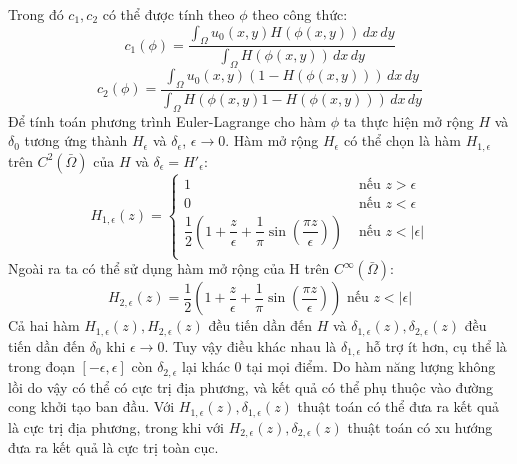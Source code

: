 \documentclass[12pt, oneside, a4]{book}
\begin{document}
Trong đó $c_1, c_2$ có thể được tính theo $\phi$ theo công thức:
\begin{equation*}
c_1(\phi)=\dfrac{\int_{\Omega}u_0(x,y)H(\phi(x,y))\,dx \,dy}{\int_{\Omega}H(\phi(x,y))\,dx\,dy}
\end{equation*}
\begin{equation*}
c_2(\phi)=\dfrac{\int_{\Omega}u_0(x,y)(1-H(\phi(x,y)))\,dx \,dy}{\int_{\Omega}H(\phi(x,y)1-H(\phi(x,y)))\,dx\,dy}
\end{equation*}
Để tính toán phương trình Euler-Lagrange cho hàm $\phi$ ta thực hiện mở rộng $H$ và $\delta_0$ tương ứng thành  $H_{\epsilon}$ và $\delta_{\epsilon}$, $\epsilon \rightarrow 0$. Hàm mở rộng $H_{\epsilon}$ có thể chọn là hàm $H_{1,{\epsilon}}$ trên $C^2(\bar{\Omega})$ của $H$ và $\delta_{\epsilon}=H'_{\epsilon}$:
\begin{equation*}
 H_{1,\epsilon}(z)=
\begin{cases}
 1 & \text{ nếu } z> \epsilon\\
0 & \text{ nếu } z <\epsilon \\
\dfrac{1}{2}(1+\dfrac{z}{\epsilon}+\dfrac{1}{\pi}\sin(\dfrac{\pi z}{\epsilon})) & \text{ nếu } z <|\epsilon|\\
   \end{cases}
\end{equation*}
Ngoài ra ta có thể sử dụng hàm mở rộng của H trên $C^{\infty}(\bar{\Omega})$:
\begin{equation*}
 H_{2,\epsilon}(z)=\dfrac{1}{2}(1+\dfrac{z}{\epsilon}+\dfrac{1}{\pi}\sin(\dfrac{\pi z}{\epsilon}))  \text{ nếu } z <|\epsilon|
\end{equation*}
Cả hai hàm $ H_{1,\epsilon}(z),  H_{2,\epsilon}(z)$ đều tiến dần đến $H$ và $ \delta_{1,\epsilon}(z),  \delta_{2,\epsilon}(z)$ đều tiến dần đến $\delta_0$ khi $\epsilon\rightarrow 0$. Tuy vậy điều khác nhau là $ \delta_{1,\epsilon}$ hỗ trợ ít hơn, cụ thể là trong đoạn $[-\epsilon, \epsilon]$ còn $ \delta_{2,\epsilon}$ lại khác 0 tại mọi điểm. Do hàm năng lượng không lồi do vậy có thể có cực trị địa phương, và kết quả có thể phụ thuộc vào đường cong khởi tạo ban đầu. Với $H_{1,\epsilon}(z), \delta_{1,\epsilon}(z)$ thuật toán có thể đưa ra kết quả là cực trị địa phương, trong khi với $H_{2,\epsilon}(z), \delta_{2,\epsilon}(z)$ thuật toán có xu hướng đưa ra kết quả là cực trị toàn cục.
\end{document}
